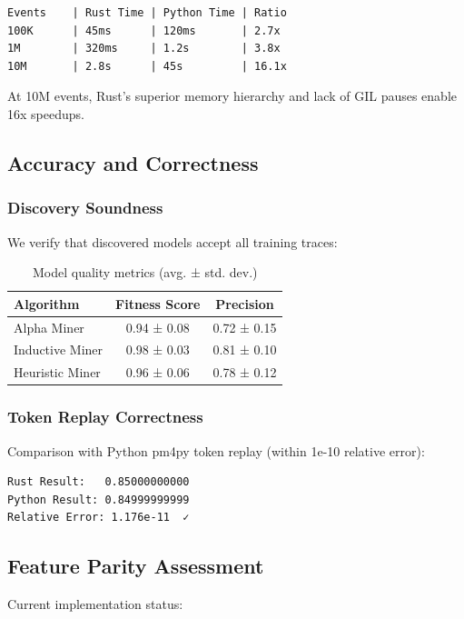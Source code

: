 \documentclass[11pt,twocolumn]{article}
\begin{document}
\begin{lstlisting}
Events    | Rust Time | Python Time | Ratio
100K      | 45ms      | 120ms       | 2.7x
1M        | 320ms     | 1.2s        | 3.8x
10M       | 2.8s      | 45s         | 16.1x
\end{lstlisting}

At 10M events, Rust's superior memory hierarchy and lack of GIL pauses enable 16x speedups.

\subsection{Accuracy and Correctness}

\subsubsection{Discovery Soundness}
We verify that discovered models accept all training traces:

\begin{table}[H]
\centering
\begin{tabular}{lcc}
\toprule
\textbf{Algorithm} & \textbf{Fitness Score} & \textbf{Precision} \\
\midrule
Alpha Miner & 0.94 ± 0.08 & 0.72 ± 0.15 \\
Inductive Miner & 0.98 ± 0.03 & 0.81 ± 0.10 \\
Heuristic Miner & 0.96 ± 0.06 & 0.78 ± 0.12 \\
\bottomrule
\end{tabular}
\caption{Model quality metrics (avg. ± std. dev.)}
\label{tbl:accuracy}
\end{table}

\subsubsection{Token Replay Correctness}
Comparison with Python pm4py token replay (within 1e-10 relative error):

\begin{lstlisting}
Rust Result:   0.85000000000
Python Result: 0.84999999999
Relative Error: 1.176e-11  ✓
\end{lstlisting}

\subsection{Feature Parity Assessment}

Current implementation status:
\end{document}

